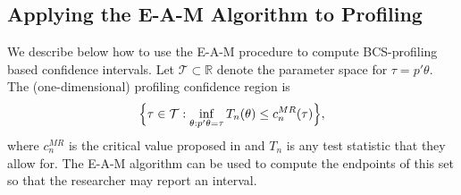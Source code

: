 \documentclass[letterpaper,11pt]{article}
\theoremstyle{myplain}
\theoremstyle{mydefinition}
\theoremstyle{myremark}
\renewcommand{\cite}{\citet}
\newcommand{\cT}{\mathcal{T}}
\numberwithin{equation}{section}
\numberwithin{figure}{section}
\begin{document}
\begin{appendix}
\section{Applying the E-A-M Algorithm to Profiling}
\label{sec:EAM_for_BCS}
We describe below how to use the E-A-M procedure to compute BCS-profiling based confidence intervals.
Let $\cT\subset\mathbb R$ denote the parameter space for  $\tau=p'\theta$.
The (one-dimensional) profiling confidence region  is
\begin{align}
\Bigl\{\tau\in\cT:\inf_{\theta:p'\theta=\tau}T_n(\theta)\le c^{MR}_n(\tau)\Bigr\},\label{eq:EAM_prof1}
\end{align}
where $c^{MR}_n$ is the critical value proposed in  \cite{BCS14_subv} and $T_n$ is any test statistic that they allow for. The E-A-M algorithm can be used to compute the
endpoints of this set so that the researcher may report an interval.


\end{appendix}
\end{document}
